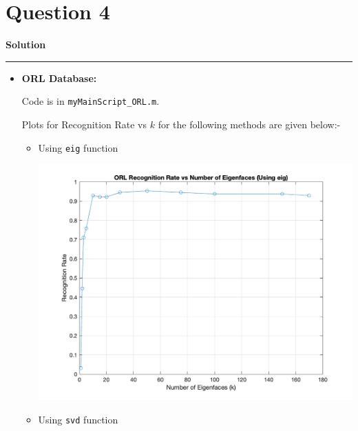 \documentclass[a4paper,12pt]{article}
\title{\cooltitle{CS663 Assignment-4}}
\author{{\bf Saksham Rathi, Kavya Gupta, Shravan Srinivasa Raghavan} \\
\small Department of Computer Science, \\
Indian Institute of Technology Bombay \\}
\date{}
\newenvironment{solution}[2][]{%
    \begin{mdframed}[linecolor=blue!70!black, linewidth=2pt, roundcorner=10pt, backgroundcolor=yellow!10!white, skipabove=12pt, skipbelow=12pt]%
        \textbf{\large #2}
        \par\noindent\rule{\textwidth}{0.4pt}
}{
    \end{mdframed}
}
\begin{document}
\maketitle

\section*{Question 4}

\begin{solution}{Solution}
	\begin{itemize}
		\item \textbf{ORL Database:}

		Code is in \texttt{myMainScript\_ORL.m}.

		Plots for Recognition Rate vs $k$ for the following methods are given below:-

		\begin{itemize}
			\item Using \texttt{eig} function
			
			\begin{center}
				\includegraphics[scale=0.4]{../images/ORL_eig.png}
			\end{center}

			\item Using \texttt{svd} function
			

\end{itemize}
\end{itemize}
\end{solution}
\end{document}
